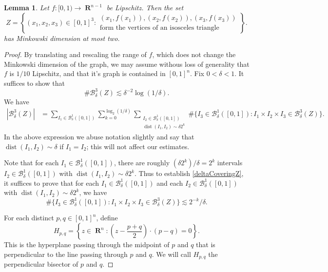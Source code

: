 \documentclass[dvipsnames,letterpaper,12pt]{article}
\numberwithin{equation}{section}
\theoremstyle{plain}
\newtheorem{lemma}{Lemma}
\theoremstyle{remark}
\DeclareMathOperator{\RR}{\mathbf{R}}
\begin{document}
\begin{lemma}
	Let $f\colon [0,1) \to \RR^{n-1}$ be Lipschitz. Then the set
	\[ Z = \left\{ (x_1,x_2,x_3) \in [0,1]^3 : \begin{array}{c} (x_1,f(x_1)), (x_2,f(x_2)), (x_3,f(x_3))\\
		\textrm{form the vertices of an isosceles triangle} \end{array} \right\}. \]
	has Minkowski dimension at most two.
\end{lemma}
\begin{proof}
By translating and rescaling the range of $f$, which does not change the Minkowski dimension of the graph, we may assume withous loss of generality that $f$ is $1/10$ Lipschitz, and that it's graph is contained in $[0,1]^n$. Fix $0<\delta<1$. It suffices to show that
	\begin{equation}\label{deltaCoveringZ}
		\# \mathcal{B}_{\delta}^{3}(Z)\lesssim\delta^{-2}\log(1/\delta).
	\end{equation}
	We have
	\begin{align*}
		|\mathcal{B}_{\delta}^{3}(Z)| &= \sum_{I_1 \in \mathcal{B}_{\delta}^1([0,1])} \sum_{k=0}^{\log_2(1/\delta)} \sum_{\substack{I_2 \in \mathcal{B}_{\delta}^1([0,1]) \\ \operatorname{dist}(I_1,I_2)\sim \delta 2^k }} \#\{ I_3\in \mathcal{B}_{\delta}^1([0,1]) : I_1\times I_2\times I_3\in \mathcal{B}_{\delta}^{3}(Z) \}.
	\end{align*}
	In the above expression we abuse notation slightly and say that $\operatorname{dist}(I_1,I_2)\sim \delta$ if $I_1=I_2$; this will not affect our estimates.

Note that for each $I_1 \in \mathcal{B}_{\delta}^1([0,1])$, there are roughly $(\delta 2^k)/\delta=2^k$ intervals $I_2\in  \mathcal{B}_{\delta}^1([0,1])$ with $\operatorname{dist}(I_1,I_2)\sim \delta 2^k$. Thus to establish \eqref{deltaCoveringZ}, it suffices to prove that for each $I_1 \in \mathcal{B}_{\delta}^1([0,1])$ and each $I_2\in  \mathcal{B}_{\delta}^1([0,1])$ with $\operatorname{dist}(I_1,I_2)\sim \delta 2^k$, we have
\begin{equation}\label{numberOfI3}
\#\{ I_3\in \mathcal{B}_{\delta}^1([0,1]) : I_1\times I_2\times I_3\in \mathcal{B}_{\delta}^{3}(Z) \}\lesssim 2^{-k}/\delta.
\end{equation}

For each distinct $p,q\in [0,1]^n$, define 
%
\[ H_{p,q}= \left\{z\in \RR^n : \left(z-\frac{p+q}{2}\right)\cdot (p-q)=0  \right\}. \]
%
This is the hyperplane passing through the midpoint of $p$ and $q$ that is perpendicular to the line passing through $p$ and $q$. We will call $H_{p,q}$ the perpendicular bisector of $p$ and $q$.


\end{proof}
\end{document}
